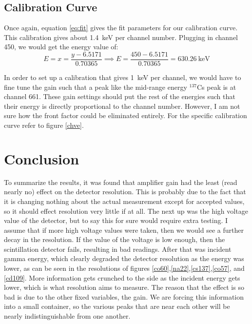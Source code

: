 \documentclass[letterpaper,12pt]{article}
\begin{document}
\subsection{Calibration Curve}
Once again, equation \eqref{eq:fit} gives the fit parameters for our calibration curve. This calibration gives about \SI{1.4}{\keV} per channel number. Plugging in channel 450, we would get the energy value of:
\begin{equation}
  \label{eq:number}
  E=x=\frac{y-6.5171}{0.70365}\implies E=\frac{450-6.5171}{0.70365}=
  \boxed{\SI{630.26}{\keV}}
\end{equation}

In order to set up a calibration that gives \SI{1}{\keV} per channel, we would have to fine tune the gain such that a peak like the mid-range energy $^{137}$Cs peak is at channel 661. These gain settings should put the rest of the energies such that their energy is directly proportional to the channel number. However, I am not sure how the front factor could be eliminated entirely. For the specific calibration curve refer to figure \ref{chve}.
\section{Conclusion}
To summarize the results, it was found that amplifier gain had the least (read nearly no) effect on the detector resolution. This is probably due to the fact that it is changing nothing about the actual measurement except for accepted values, so it should effect resolution very little if at all. The next up was the high voltage value of the detector, but to say this for sure would require extra testing. I assume that if more high voltage values were taken, then we would see a further decay in the resolution. If the value of the voltage is low enough, then the scintillation detector fails, resulting in bad readings. After that was incident gamma energy, which clearly degraded the detector resolution as the energy was lower, as can be seen in the resolutions of figures
\ref{co60},\ref{na22},\ref{cs137},\ref{co57}, and \ref{cd109}. More information gets crunched to the side as the incident energy gets lower, which is what resolution aims to measure. The reason that the effect is so bad is due to the other fixed variables, the gain. We are forcing this information into a small container, so the various peaks that are near each other will be nearly indistinguishable from one another. 



\end{document}
